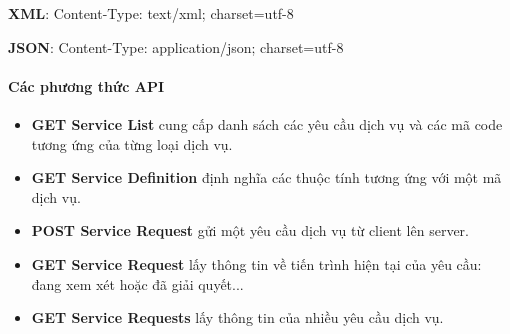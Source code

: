 \documentclass[a4paper]{article}
\begin{document}
\textbf{XML}: Content-Type: text/xml; charset=utf-8

\textbf{JSON}: Content-Type: application/json; charset=utf-8
\paragraph{Các phương thức API}
\begin{itemize}
	\item \textbf{GET Service List} cung cấp danh sách các yêu cầu dịch vụ và các mã code tương ứng của từng loại dịch vụ.
	\item \textbf{GET Service Definition} định nghĩa các thuộc tính tương ứng với một mã dịch vụ.
	\item \textbf{POST Service Request} gửi một yêu cầu dịch vụ từ client lên server.
	\item \textbf{GET Service Request} lấy thông tin về tiến trình hiện tại của yêu cầu: đang xem xét hoặc đã giải quyết...
	\item \textbf{GET Service Requests} lấy thông tin của nhiều yêu cầu dịch vụ.
\end{itemize}
\end{document}
